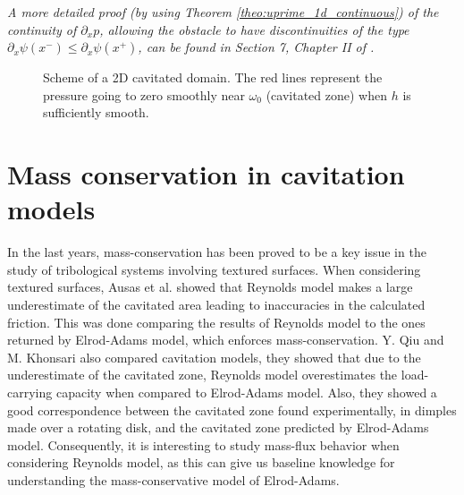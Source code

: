\begin{remark}
\it A more detailed proof (by using Theorem \ref{theo:uprime_1d_continuous}) of the continuity of $\partial_x p$, allowing the obstacle to have discontinuities of the type $\partial _x \psi(x^-)\leq \partial _x \psi(x^+)$, can be found in Section 7, Chapter II of \cite{kinderlehrer1980}.
\end{remark}
\begin{figure}[h!]
\centering 
\def\svgwidth{\textwidth}	
\footnotesize{
\caption[2D cavitated domain scheme.]{Scheme of a 2D cavitated domain. The red lines represent the pressure going to zero smoothly near $\omega_0$ (cavitated zone) when $h$ is sufficiently smooth.}\label{fig:2d_omega}}
\end{figure}
\section{Mass conservation in cavitation models}\label{sec:mass_cons_cav_models}
In the last years, mass-conservation has been proved to be a key issue in the study of tribological systems involving textured surfaces. When considering textured surfaces, Ausas et al. \cite{ausas07} showed that Reynolds model makes a large underestimate of the cavitated area leading to inaccuracies in the calculated friction. This was done comparing the results of Reynolds model to the ones returned by Elrod-Adams model, which enforces mass-conservation. Y. Qiu and M. Khonsari \cite{qiu2009} also compared cavitation models, they showed that due to the underestimate of the cavitated zone, Reynolds model overestimates the load-carrying capacity when compared to Elrod-Adams model. Also, they showed a good correspondence between the cavitated zone found experimentally, in dimples made over a rotating disk, and the cavitated zone predicted by Elrod-Adams model. Consequently, it is interesting to study mass-flux behavior when considering Reynolds model, as this can give us baseline knowledge for understanding the mass-conservative model of Elrod-Adams.

